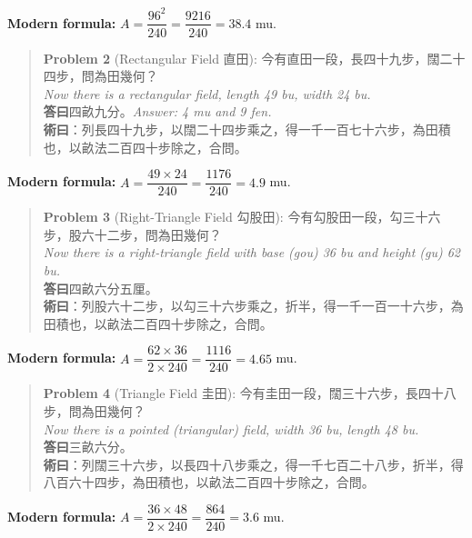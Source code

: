 \documentclass[11pt,a4paper]{article}
\newenvironment{problembox}{%
  \begin{quote}
  \itshape
  \color{problemcolor}
}{%
  \end{quote}
}
\begin{document}
\textbf{Modern formula:} $A = \dfrac{96^2}{240} = \dfrac{9216}{240} = 38.4$ mu.

\vspace{0.3cm}

\begin{problembox}
\textbf{Problem 2} (Rectangular Field 直田): 今有直田一段，長四十九步，闊二十四步，問為田幾何？\\[0.2cm]
\textit{Now there is a rectangular field, length 49 bu, width 24 bu.}\\[0.2cm]
\textbf{答曰}四畝九分。\textit{Answer: 4 mu and 9 fen.}\\[0.2cm]
\textbf{術曰}：列長四十九步，以闊二十四步乘之，得一千一百七十六步，為田積也，以畝法二百四十步除之，合問。
\end{problembox}

\textbf{Modern formula:} $A = \dfrac{49 \times 24}{240} = \dfrac{1176}{240} = 4.9$ mu.

\vspace{0.3cm}

\begin{problembox}
\textbf{Problem 3} (Right-Triangle Field 勾股田): 今有勾股田一段，勾三十六步，股六十二步，問為田幾何？\\[0.2cm]
\textit{Now there is a right-triangle field with base (gou) 36 bu and height (gu) 62 bu.}\\[0.2cm]
\textbf{答曰}四畝六分五厘。\\[0.2cm]
\textbf{術曰}：列股六十二步，以勾三十六步乘之，折半，得一千一百一十六步，為田積也，以畝法二百四十步除之，合問。
\end{problembox}

\textbf{Modern formula:} $A = \dfrac{62 \times 36}{2 \times 240} = \dfrac{1116}{240} = 4.65$ mu.

\vspace{0.3cm}

\begin{problembox}
\textbf{Problem 4} (Triangle Field 圭田): 今有圭田一段，闊三十六步，長四十八步，問為田幾何？\\[0.2cm]
\textit{Now there is a pointed (triangular) field, width 36 bu, length 48 bu.}\\[0.2cm]
\textbf{答曰}三畝六分。\\[0.2cm]
\textbf{術曰}：列闊三十六步，以長四十八步乘之，得一千七百二十八步，折半，得八百六十四步，為田積也，以畝法二百四十步除之，合問。
\end{problembox}

\textbf{Modern formula:} $A = \dfrac{36 \times 48}{2 \times 240} = \dfrac{864}{240} = 3.6$ mu.
\end{document}
